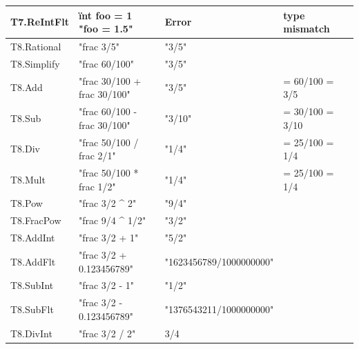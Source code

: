 \documentclass[a4paper, oneside, 11pt]{report}
\begin{document}
\begin{table}
\begin{tabular}{|p{1.5in}|p{1.5in}|p{1.6in}|p{1.6in}|p{2.4in}|}
\hline
T7.ReIntFlt    & ïnt foo = 1 "foo = 1.5"                        & Error                                    & type mismatch                          \\ 
\hline
T8.Rational    & "frac 3/5"                                     & "3/5"                                    &                                        \\ 
\hline
T8.Simplify    & "frac 60/100"                                  & "3/5"                                    &                                        \\ 
\hline
T8.Add         & "frac 30/100 + frac 30/100"                    & "3/5"                                    & = 60/100 = 3/5                         \\ 
\hline
T8.Sub         & "frac 60/100 - frac 30/100"                    & "3/10"                                   & = 30/100 = 3/10                        \\ 
\hline
T8.Div         & "frac 50/100 / frac 2/1"                       & "1/4"                                    & = 25/100 = 1/4                         \\ 
\hline
T8.Mult        & "frac 50/100 * frac 1/2"                       & "1/4"                                    & = 25/100 = 1/4                         \\ 
\hline
T8.Pow         & "frac 3/2 \^{} 2"                              & "9/4"                                    &                                        \\ 
\hline
T8.FracPow     & "frac 9/4 \^{} 1/2"                            & "3/2"                                    &                                        \\ 
\hline
T8.AddInt      & "frac 3/2 + 1"                                 & "5/2"                                    &                                        \\ 
\hline
T8.AddFlt      & "frac 3/2 + 0.123456789"                       & "1623456789/1000000000"                  &                                        \\ 
\hline
T8.SubInt      & "frac 3/2 - 1"                                 & "1/2"                                    &                                        \\ 
\hline
T8.SubFlt      & "frac 3/2 - 0.123456789"                       & "1376543211/1000000000"                  &                                        \\ 
\hline
T8.DivInt      & "frac 3/2 / 2"                                 & 3/4                                      &                                        \\ 

\end{tabular}
\end{table}
\end{document}
